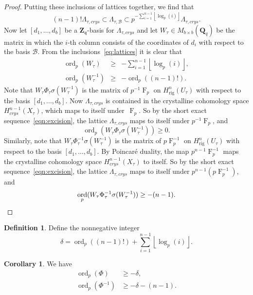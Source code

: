 \documentclass[a4paper,11pt]{article}
\numberwithin{equation}{section}
\providecommand{\floor}[1]{\left\lfloor#1\right\rfloor}   %
\newcommand{\ZZ}{\mathbf{Z}} %
\newcommand{\QQ}{\mathbf{Q}} %
\DeclareMathOperator{\ord}{ord}          %
\DeclareMathOperator{\Frob}{F}           %
\providecommand{\Hrig}{H_{\text{rig}}}  %
\providecommand{\cB}{\mathcal{B}} %
\theoremstyle{definition}
\newtheorem{cor}[thm]{Corollary}
\newtheorem{defn}[thm]{Definition}
\begin{document}
\begin{proof}
Putting these inclusions of lattices together, we find that
\begin{equation} \label{eq:lattices}
(n-1)! \Lambda_{\tau,crys} \subset \Lambda_{\tau,\cB} \subset p^{-\sum_{i=1}^{n-1} \floor{\log_p(i)}} \Lambda_{\tau,crys}.
\end{equation}
Now let $[d_1, \dotsc, d_b]$ be a $\ZZ_{\mathfrak{q}}$-basis for 
$\Lambda_{\tau,crys}$ and let $W_{\tau} \in M_{b \times b}(\QQ_q)$ be 
the matrix in which the $i$-th column 
consists of the coordinates of $d_i$ with respect to the basis $\cB$. From the 
inclusions~\eqref{eq:lattices} it is clear that 
\begin{eqnarray*}
\ord_p(W_{\tau}) &\geq& -\sum_{i=1}^{n-1} \floor{\log_p(i)}, \\
\ord_p(W_{\tau}^{-1}) &\geq& -\ord_p((n-1)!).
\end{eqnarray*}
Note that $W_{\tau} \Phi_{\tau} \sigma(W_{\tau}^{-1})$ is the matrix of 
$p^{-1}\Frob_{p}$ on $\Hrig^n(U_{\tau})$ with respect to the basis 
$[d_1,\dotsc,d_b]$. Now $\Lambda_{\tau,crys}$ is contained in the crystalline 
cohomology space $H^{n-1}_{crys}(X_{\tau})$, which maps to itself 
under~$\Frob_p$. So by the short exact sequence~\eqref{eqn:excision}, the 
lattice $\Lambda_{\tau,crys}$ maps to itself under $p^{-1}\Frob_{p}$, and
\[
\ord_p(W_{\tau} \Phi_{\tau} \sigma(W_{\tau}^{-1})) \geq 0.
\]
Similarly, note that $W_{\tau} \Phi_{\tau}^{-1} \sigma(W_{\tau}^{-1})$ is 
the matrix of $p\Frob_p^{-1}$ on $\Hrig^n(U_{\tau})$ with respect to the 
basis $[d_1,\dotsc,d_b]$. By Poincar\'e duality, the map $p^{n-1}\Frob_p^{-1}$ 
maps the crystalline cohomology space $H^{n-1}_{crys}(X_{\tau})$ to itself. 
So by the short exact sequence~\eqref{eqn:excision}, the lattice 
$\Lambda_{\tau,crys}$ maps to itself under $p^{n-1} (p\Frob_p^{-1})$, and 
\begin{equation*}
\ord_p(W_{\tau} \Phi_{\tau}^{-1} \sigma(W_{\tau}^{-1})) \geq -(n-1). \qedhere
\end{equation*}
\end{proof}

\begin{defn} \label{defn:delta}
Define the nonnegative integer
\[
\delta = \ord_p((n-1)!)+\sum_{i=1}^{n-1} \floor{\log_p(i)}.
\]
\end{defn}

\begin{cor} \label{cor:delta} We have 
\begin{align*}
\ord_p(\Phi) &\geq -\delta, \\
\ord_p(\Phi^{-1}) &\geq -\delta-(n-1).
\end{align*}
\end{cor}
\end{document}
